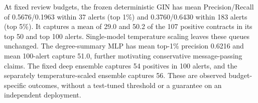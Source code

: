 At fixed review budgets, the frozen deterministic GIN has mean Precision/Recall of 0.5676/0.1963 within 37 alerts (top 1\%) and 0.3760/0.6430 within 183 alerts (top 5\%). It captures a mean of 29.0 and 50.2 of the 107 positive contracts in its top 50 and top 100 alerts. Single-model temperature scaling leaves these queues unchanged. The degree-summary MLP has mean top-1\% precision 0.6216 and mean 100-alert capture 51.0, further motivating conservative message-passing claims. The fixed deep ensemble captures 54 positives in 100 alerts, and the separately temperature-scaled ensemble captures 56. These are observed budget-specific outcomes, without a test-tuned threshold or a guarantee on an independent deployment.
